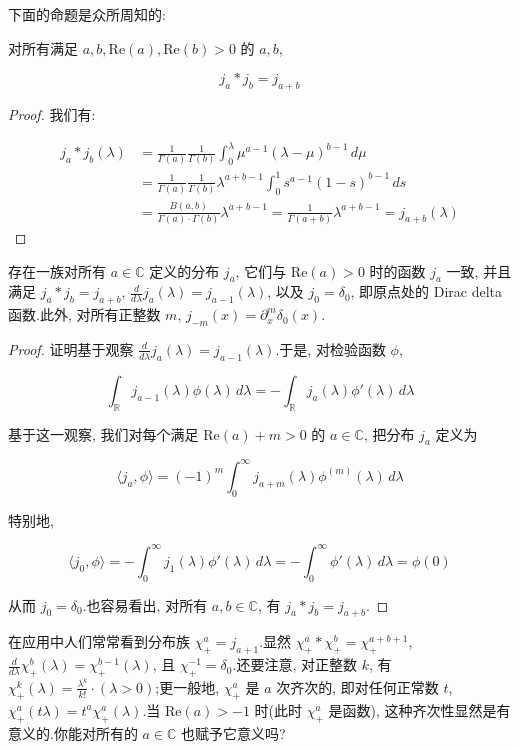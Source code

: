 下面的命题是众所周知的:

\begin{proposition}\label{prop:c3-3.3}
对所有满足 $a, b, \mathrm{Re}(a), \mathrm{Re}(b)>0$ 的 $a, b$,

\[
j_a*j_b = j_{a+b}
\]
\end{proposition}

\begin{proof}
我们有:

\[
\begin{aligned}
j_a*j_b(\lambda) &= \frac{1}{\Gamma(a)}\frac{1}{\Gamma(b)}\int_0^{\lambda}\mu^{a-1}(\lambda-\mu)^{b-1}\, d\mu \\
&= \frac{1}{\Gamma(a)}\frac{1}{\Gamma(b)}\lambda^{a+b-1}\int_0^1s^{a-1}(1-s)^{b-1}\, ds \\
&= \frac{B(a, b)}{\Gamma(a)\cdot\Gamma(b)}\lambda^{a+b-1} = \frac{1}{\Gamma(a+b)}\lambda^{a+b-1} = j_{a+b}(\lambda)
\end{aligned}
\]
\end{proof}

\begin{proposition}\label{prop:c3-3.4}
存在一族对所有 $a\in\mathbb{C}$ 定义的分布 $j_a$, 它们与 $\mathrm{Re}(a)>0$ 时的函数 $j_a$ 一致, 并且满足 $j_a*j_b = j_{a+b}$, $\frac{d}{d\lambda}j_a(\lambda) = j_{a-1}(\lambda)$, 以及 $j_0 = \delta_0$, 即原点处的 Dirac delta 函数.此外, 对所有正整数 $m$, $j_{-m}(x) = \partial_x^m\delta_0(x)$.
\end{proposition}

\begin{proof}
证明基于观察 $\frac{d}{d\lambda}j_a(\lambda) = j_{a-1}(\lambda)$.于是, 对检验函数 $\phi$,

\[
\int_{\mathbb{R}}j_{a-1}(\lambda)\phi(\lambda)\, d\lambda = -\int_{\mathbb{R}}j_a(\lambda)\phi'(\lambda)\, d\lambda
\]

基于这一观察, 我们对每个满足 $\mathrm{Re}(a)+m>0$ 的 $a\in\mathbb{C}$, 把分布 $j_a$ 定义为

\[
\langle j_a, \phi\rangle = (-1)^m\int_0^{\infty}j_{a+m}(\lambda)\phi^{(m)}(\lambda)\, d\lambda
\]

特别地,

\[
\langle j_0, \phi\rangle = -\int_0^{\infty}j_1(\lambda)\phi'(\lambda)\, d\lambda = -\int_0^{\infty}\phi'(\lambda)\, d\lambda = \phi(0)
\]

从而 $j_0 = \delta_0$.也容易看出, 对所有 $a, b\in\mathbb{C}$, 有 $j_a*j_b = j_{a+b}$.
\end{proof}

\begin{remark*}
在应用中人们常常看到分布族 $\chi_+^a = j_{a+1}$.显然 $\chi_+^a*\chi_+^b = \chi_+^{a+b+1}$, $\frac{d}{d\lambda}\chi_+^b(\lambda) = \chi_+^{b-1}(\lambda)$, 且 $\chi_+^{-1} = \delta_0$.还要注意, 对正整数 $k$, 有 $\chi_+^k(\lambda) = \frac{\lambda^k}{k!}\cdot(\lambda>0)$;更一般地, $\chi_+^a$ 是 $a$ 次齐次的, 即对任何正常数 $t$, $\chi_+^a(t\lambda) = t^a\chi_+^a(\lambda)$.当 $\mathrm{Re}(a)>-1$ 时(此时 $\chi_+^a$ 是函数), 这种齐次性显然是有意义的.你能对所有的 $a\in\mathbb{C}$ 也赋予它意义吗?
\end{remark*}

